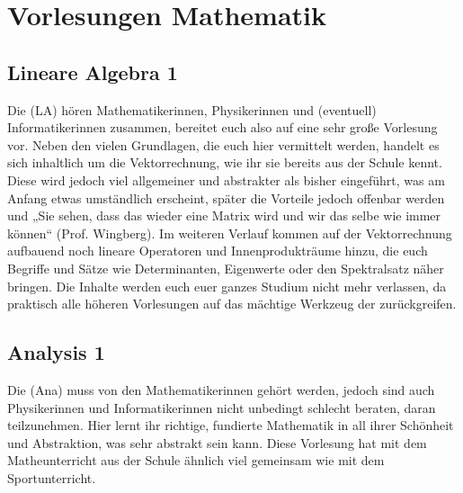 \section*{Vorlesungen Mathematik}

\subsection{Lineare Algebra 1}
\label{la1}
Die  (\gls{LA}) hören Mathematikerinnen, Physikerinnen und (eventuell) Informatikerinnen zusammen, bereitet euch also auf eine sehr große Vorlesung vor. Neben den vielen Grundlagen, die euch hier vermittelt werden,  handelt es sich inhaltlich um die Vektorrechnung, wie ihr sie bereits aus der Schule kennt. Diese wird jedoch viel allgemeiner und abstrakter als bisher eingeführt, was am Anfang etwas umständlich erscheint, später die Vorteile jedoch offenbar werden und „Sie sehen, dass das wieder eine Matrix wird und wir das selbe wie immer können“ (Prof. Wingberg). Im weiteren Verlauf kommen auf der Vektorrechnung aufbauend noch lineare Operatoren und Innenprodukträume hinzu, die euch Begriffe und Sätze wie Determinanten, Eigenwerte oder den Spektralsatz näher bringen. Die Inhalte werden euch euer ganzes Studium nicht mehr verlassen, da praktisch alle höheren Vorlesungen auf das mächtige Werkzeug der  zurückgreifen.

\vspace{-2mm}

\subsection{Analysis 1}
\label{ana1}
Die  (\gls{Ana}) muss von den Mathematikerinnen gehört werden, jedoch sind auch Physikerinnen und Informatikerinnen nicht unbedingt schlecht beraten, daran teilzunehmen. Hier lernt ihr richtige, fundierte Mathematik in all ihrer Schönheit und Abstraktion, was sehr abstrakt sein kann. Diese Vorlesung hat mit dem Matheunterricht aus der Schule ähnlich viel gemeinsam wie mit dem Sportunterricht.


